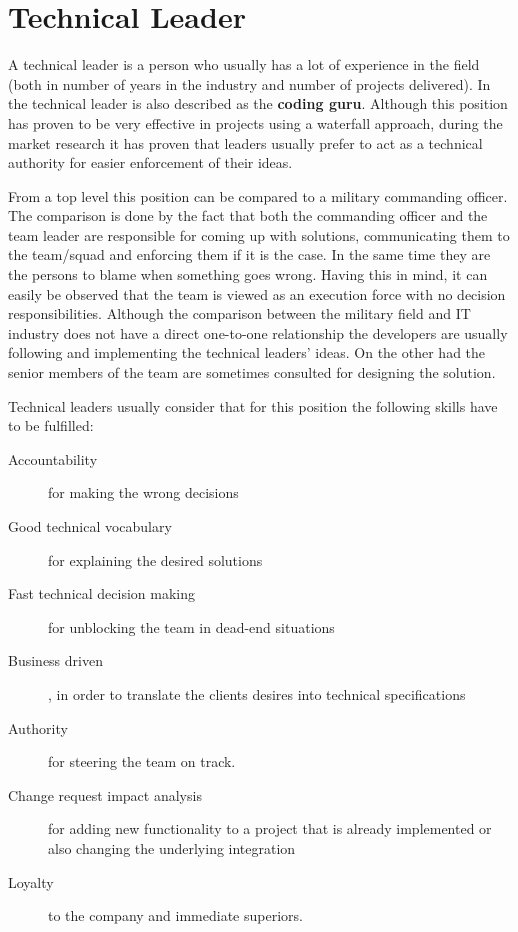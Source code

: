 \section{Technical Leader}
\label{sec:tech-lead}
A technical leader is a person who usually has a lot of experience in the field (both in number of years in the industry and number of projects delivered). In \cite{abur-tl} the technical leader is also described as the \textbf{coding guru}. Although this position has proven to be very effective in projects using a waterfall approach, during the market research it has proven that leaders usually prefer to act as a technical authority for easier enforcement of their ideas.

From a top level this position can be compared to a military commanding officer. The comparison is done by the fact that both the commanding officer and the team leader are responsible for coming up with solutions, communicating them to the team/squad and enforcing them if it is the case. In the same time they are the persons to blame when something goes wrong. Having this in mind, it can easily be observed that the team is viewed as an execution force with no decision responsibilities.  Although the comparison between the military field and IT industry does not have a direct one-to-one relationship the developers are usually following and implementing the technical leaders' ideas. On the other had the senior members of the team are sometimes consulted for designing the solution.

Technical leaders usually consider that for this position the following skills have to be fulfilled:
\begin{description}
\item [Accountability] for making the wrong decisions
\item [Good technical vocabulary] for explaining the desired solutions
\item [Fast technical decision making] for unblocking the team in dead-end situations
\item [Business driven], in order to translate the clients desires into technical specifications
\item [Authority] for steering the team on track.
\item [Change request impact analysis] for adding new functionality  to a project that is already implemented or also changing the underlying integration
\item [Loyalty] to the company and immediate superiors.
\end{description}

